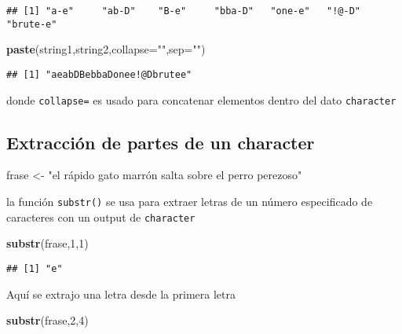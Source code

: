 \documentclass[]{article}
\newenvironment{Shaded}{\begin{snugshade}}{\end{snugshade}}
\newcommand{\KeywordTok}[1]{\textcolor[rgb]{0.13,0.29,0.53}{\textbf{#1}}}
\newcommand{\DataTypeTok}[1]{\textcolor[rgb]{0.13,0.29,0.53}{#1}}
\newcommand{\DecValTok}[1]{\textcolor[rgb]{0.00,0.00,0.81}{#1}}
\newcommand{\StringTok}[1]{\textcolor[rgb]{0.31,0.60,0.02}{#1}}
\newcommand{\NormalTok}[1]{#1}
\begin{document}
\begin{verbatim}
## [1] "a-e"     "ab-D"    "B-e"     "bba-D"   "one-e"   "!@-D"    "brute-e"
\end{verbatim}

\begin{Shaded}
\begin{Highlighting}[]
\KeywordTok{paste}\NormalTok{(string1,string2,}\DataTypeTok{collapse=}\StringTok{""}\NormalTok{,}\DataTypeTok{sep=}\StringTok{""}\NormalTok{)}
\end{Highlighting}
\end{Shaded}

\begin{verbatim}
## [1] "aeabDBebbaDonee!@Dbrutee"
\end{verbatim}

donde \texttt{collapse=} es usado para concatenar elementos dentro del
dato \texttt{character}

\subsection{Extracción de partes de un
character}\label{extracciuxf3n-de-partes-de-un-character}

\begin{Shaded}
\begin{Highlighting}[]
\NormalTok{frase <-}\StringTok{ "el rápido gato marrón salta sobre el perro perezoso"}
\end{Highlighting}
\end{Shaded}

la función \texttt{substr()} se usa para extraer letras de un número
especificado de caracteres con un output de \texttt{character}

\begin{Shaded}
\begin{Highlighting}[]
\KeywordTok{substr}\NormalTok{(frase,}\DecValTok{1}\NormalTok{,}\DecValTok{1}\NormalTok{)}
\end{Highlighting}
\end{Shaded}

\begin{verbatim}
## [1] "e"
\end{verbatim}

Aquí se extrajo una letra desde la primera letra

\begin{Shaded}
\begin{Highlighting}[]
\KeywordTok{substr}\NormalTok{(frase,}\DecValTok{2}\NormalTok{,}\DecValTok{4}\NormalTok{)}
\end{Highlighting}
\end{Shaded}
\end{document}
